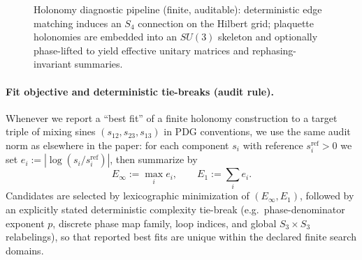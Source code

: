 \begin{figure}[t]
\centering
{}
\caption{Holonomy diagnostic pipeline (finite, auditable): deterministic edge matching induces an $S_4$ connection on the Hilbert grid; plaquette holonomies are embedded into an $SU(3)$ skeleton and optionally phase-lifted to yield effective unitary matrices and rephasing-invariant summaries.}
\label{fig:holonomy_pipeline}
\end{figure}

\paragraph{Fit objective and deterministic tie-breaks (audit rule).}
Whenever we report a ``best fit'' of a finite holonomy construction to a target triple of mixing sines $(s_{12},s_{23},s_{13})$ in PDG conventions, we use the same audit norm as elsewhere in the paper:
for each component $s_i$ with reference $s_i^{\mathrm{ref}}>0$ we set $e_i:=|\log(s_i/s_i^{\mathrm{ref}})|$, then summarize by
\[
E_\infty:=\max_i e_i,\qquad E_1:=\sum_i e_i.
\]
Candidates are selected by lexicographic minimization of $(E_\infty,E_1)$, followed by an explicitly stated deterministic complexity tie-break (e.g.\ phase-denominator exponent $p$, discrete phase map family, loop indices, and global $S_3\times S_3$ relabelings), so that reported best fits are unique within the declared finite search domains.

